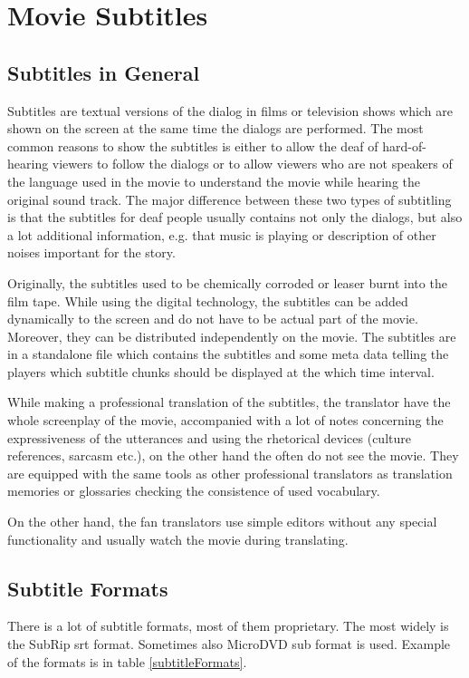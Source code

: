 \section{Movie Subtitles}
\subsection{Subtitles in General}

Subtitles are textual versions of the dialog in films or television shows which are shown on the screen at the same time the dialogs are performed. The most common reasons to show the subtitles is either to allow the deaf of hard-of-hearing viewers to follow the dialogs or to allow viewers who are not speakers of the language used in the movie to understand the movie while hearing the original sound track. The major difference between these two types of subtitling is that the subtitles for deaf people usually contains not only the dialogs, but also a lot additional information, e.g. that music is playing or description of other noises important for the story. 

Originally, the subtitles used to be chemically corroded or leaser burnt into the film tape. While using the digital technology, the subtitles can be added dynamically to the screen and do not have to be actual part of the movie. Moreover, they can be distributed independently on the movie. The subtitles are in a standalone file which contains the subtitles and some meta data telling the players which subtitle chunks should be displayed at the which time interval.

While making a professional translation of the subtitles, the translator have the whole screenplay of the movie, accompanied with a lot of notes concerning the expressiveness of the utterances and using the rhetorical devices (culture references, sarcasm etc.), on the other hand the often do not see the movie. They are equipped with the same tools as other professional translators as translation memories or glossaries checking the consistence of used vocabulary.

On the other hand, the fan translators use simple editors without any special functionality and usually watch the movie during translating.

\subsection{Subtitle Formats}

There is a lot of subtitle formats, most of them proprietary. The most widely is the SubRip srt format. Sometimes also MicroDVD sub format is used. Example of the formats is in table \ref{subtitleFormats}.

